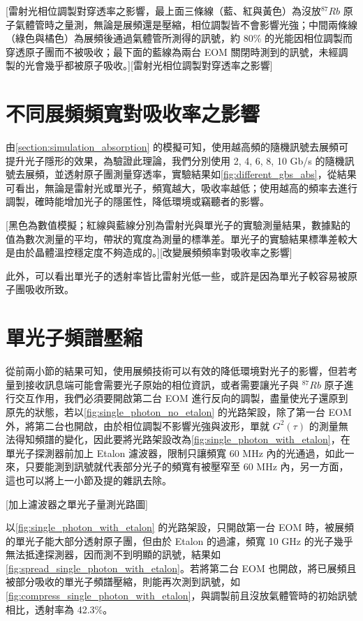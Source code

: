 \documentclass[class=NCU_thesis, crop=false]{standalone}
\begin{document}
[雷射光相位調製對穿透率之影響，最上面三條線（藍、紅與黃色）為沒放$^{87}Rb$ 原子氣體管時之量測，無論是展頻還是壓縮，相位調製皆不會影響光強；中間兩條線（綠色與橘色）為展頻後通過氣體管所測得的訊號，約 80\% 的光能因相位調製而穿透原子團而不被吸收；最下面的藍線為兩台 EOM 關閉時測到的訊號，未經調製的光會幾乎都被原子吸收。][雷射光相位調製對穿透率之影響]

\section{不同展頻頻寬對吸收率之影響}
由\cref{section:simulation_absorption} 的模擬可知，使用越高頻的隨機訊號去展頻可提升光子隱形的效果，為驗證此理論，我們分別使用 2, 4, 6, 8, 10 Gb/s 的隨機訊號去展頻，並透射原子團測量穿透率，實驗結果如\cref{fig:different_gbs_abs}，從結果可看出，無論是雷射光或單光子，頻寬越大，吸收率越低；使用越高的頻率去進行調製，確時能增加光子的隱匿性，降低環境或竊聽者的影響。

[黑色為數值模擬；紅線與藍線分別為雷射光與單光子的實驗測量結果，數據點的值為數次測量的平均，帶狀的寬度為測量的標準差。單光子的實驗結果標準差較大是由於晶體溫控穩定度不夠造成的。][改變展頻頻率對吸收率之影響]

此外，可以看出單光子的透射率皆比雷射光低一些，或許是因為單光子較容易被原子團吸收所致。

\section{單光子頻譜壓縮}

從前兩小節的結果可知，使用展頻技術可以有效的降低環境對光子的影響，但若考量到接收訊息端可能會需要光子原始的相位資訊，或者需要讓光子與 $^{87}Rb$ 原子進行交互作用，我們必須要開啟第二台 EOM 進行反向的調製，盡量使光子還原到原先的狀態，若以\cref{fig:single_photon_no_etalon} 的光路架設，除了第一台 EOM 外，將第二台也開啟，由於相位調製不影響光強與波形，單就 $G^{2}(\tau)$ 的測量無法得知頻譜的變化，因此要將光路架設改為\cref{fig:single_photon_with_etalon}，在單光子探測器前加上 Etalon 濾波器，限制只讓頻寬 60 MHz 內的光通過，如此一來，只要能測到訊號就代表部分光子的頻寬有被壓窄至 60 MHz 內，另一方面，這也可以將上一小節及提的雜訊去除。

[加上濾波器之單光子量測光路圖]

以\cref{fig:single_photon_with_etalon} 的光路架設，只開啟第一台 EOM 時，被展頻的單光子能大部分透射原子團，但由於 Etalon 的過濾，頻寬 10 GHz 的光子幾乎無法抵達探測器，因而測不到明顯的訊號，結果如\cref{fig:spread_single_photon_with_etalon}。若將第二台 EOM 也開啟，將已展頻且被部分吸收的單光子頻譜壓縮，則能再次測到訊號，如\cref{fig:compress_single_photon_with_etalon}，與調製前且沒放氣體管時的初始訊號相比，透射率為 42.3\%。
\end{document}
